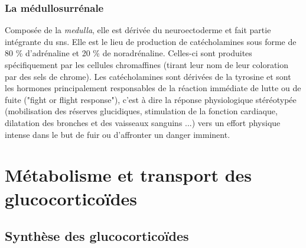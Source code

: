 \documentclass[../main.tex]{subfiles}
\begin{document}
	\subsubsection{La médullosurrénale}
		Composée de la \textit{medulla}, elle est dérivée du neuroectoderme et fait partie intégrante du \gls{sns}.
		Elle est le lieu de production de catécholamines sous forme de 80 \% d'adrénaline et 20 \% de noradrénaline.
		Celles-ci sont produites spécifiquement par les cellules chromaffines (tirant leur nom de leur coloration par des sels de chrome).
		Les catécholamines sont dérivées de la tyrosine et sont les hormones principalement responsables de la réaction immédiate de lutte ou de fuite ("fight or flight response"), c'est à dire la réponse physiologique stéréotypée (mobilisation des réserves glucidiques, stimulation de la fonction cardiaque, dilatation des bronches et des vaisseaux sanguins ...) vers un effort physique intense dans le but de fuir ou d'affronter un danger imminent.





\section{Métabolisme et transport des glucocorticoïdes}


	\subsection{Synthèse des glucocorticoïdes}
\end{document}
